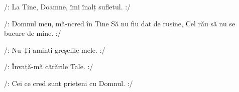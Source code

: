 \beginverse
/: La Tine, Doamne, îmi înalț sufletul. :/
\endverse

\beginchorus
/: Domnul meu, mă-ncred în Tine
Să nu fiu dat de rușine,
Cel rău să nu se bucure de mine. :/
\endchorus

\beginverse
/: Nu-Ți aminti greșelile mele. :/
\endverse

\beginverse
/: Învață-mă cărările Tale. :/
\endverse

\beginverse
/: Cei ce cred sunt prieteni cu Domnul. :/
\endverse
\endsong